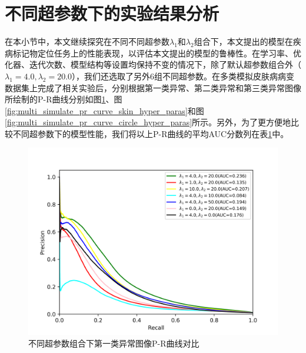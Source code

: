 \section{不同超参数下的实验结果分析}\label{sec:multi_classes_hyper_paras}
在本小节中，本文继续探究在不同不同超参数$\lambda_{1}$和$\lambda_{2}$组合下，本文提出的模型在疾病标记物定位任务上的性能表现，以评估本文提出的模型的鲁棒性。在学习率、优化器、迭代次数、模型结构等设置均保持不变的情况下，除了默认超参数组合外（$\lambda_{1}=4.0,\lambda_{2}=20.0$），我们还选取了另外$6$组不同超参数。在多类模拟皮肤病病变数据集上完成了相关实验后，分别根据第一类异常、第二类异常和第三类异常图像所绘制的P-R曲线分别如图\ref{fig:multi_simulate_pr_curve_image_net_hyper_paras}、图\ref{fig:multi_simulate_pr_curve_skin_hyper_paras}和图\ref{fig:multi_simulate_pr_curve_circle_hyper_paras}所示。另外，为了更方便地比较不同超参数下的模型性能，我们将以上P-R曲线的平均AUC分数列在表\ref{fig:multi_simulate_pr_curve_image_net_hyper_paras}中。
\begin{figure}[H]
	\centering
	\includegraphics[width=1.0\textwidth]{figure/pr_curve_multi_skin_hyper_paras/IMAGE_NET_pr_curve.png}
	\caption{不同超参数组合下第一类异常图像P-R曲线对比} 
	\label{fig:multi_simulate_pr_curve_image_net_hyper_paras}
\end{figure}
